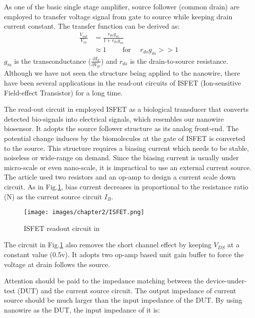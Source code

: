 As one of the basic single stage amplifier, source follower (common drain) are employed to transfer voltage signal from gate to source while keeping drain current constant.
The transfer function can be derived as:
\setlength{\mathindent}{5.5cm}
\begin{align}
    \frac{V_{out}}{V_{in}} & = \frac{r_{ds}g_m}{1 + r_{ds}g_m} \\    \label{eq:sfTF}
                           & \approx 1 \qquad \text{ for } \quad r_{ds}g_m >> 1
\end{align}
$g_m$ is the transconductance ($\frac{\partial I_d}{\partial V_{gs}}$) and $r_{ds}$ is the drain-to-source resistance.
Although we have not seen the structure being applied to the nanowire, there have been several applications in the read-out circuits of ISFET (Ion-sensitive Field-effect Transistor)\cite{SF1, SF2} for a long time.

The read-out circuit in \cite{SF1} employed ISFET as a biological transducer that converts detected bio-signals into electrical signals, which resembles our nanowire biosensor.
It adopts the source follower structure as its analog front-end.
The potential change induces by the biomolecules at the gate of ISFET is converted to the source.
This structure requires a biasing current which needs to be stable, noiseless or wide-range on demand.
Since the biasing current is usually under micro-scale or even nano-scale, it is impractical to use an external current source.
The article \cite{SF1} used two resistors and an op-amp to design a current scale down circuit.
As in Fig.\ref{fig:ISFET}, bias current decreases in proportional to the resistance ratio (N) as the current source circuit $I_B$.

\begin{figure}[h]
    \centering
    \texttt{[image: images/chapter2/ISFET.png]}
    \fontsize{6}{7}\selectfont
    \caption{ISFET readout circuit in \cite{SF1}}
    \label{fig:ISFET}
\end{figure}
The circuit in Fig.\ref{fig:ISFET} also removes the short channel effect by keeping $V_{DS}$ at a constant value (0.5v).
It adopts two op-amp based unit gain buffer to force the voltage at drain follows the source.

Attention should be paid to the impedance matching between the device-under-test (DUT) and the current source circuit.
The output impedance of current source should be much larger than the input impedance of the DUT.
By using nanowire as the DUT, the input impedance of it is:

